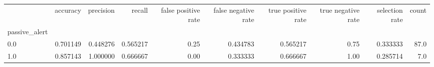 \begin{tabular}{lrrrrrrrrr}
\toprule
{} &  accuracy &  precision &    recall &  false positive rate &  false negative rate &  true positive rate &  true negative rate &  selection rate &  count \\
passive\_alert &           &            &           &                      &                      &                     &                     &                 &        \\
\midrule
0.0           &  0.701149 &   0.448276 &  0.565217 &                 0.25 &             0.434783 &            0.565217 &                0.75 &        0.333333 &   87.0 \\
1.0           &  0.857143 &   1.000000 &  0.666667 &                 0.00 &             0.333333 &            0.666667 &                1.00 &        0.285714 &    7.0 \\
\bottomrule
\end{tabular}
